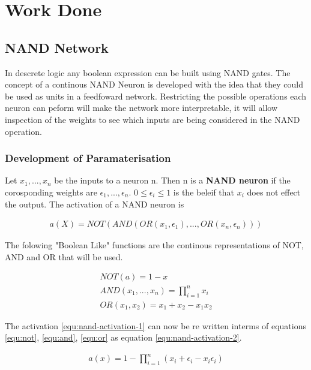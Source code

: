 \chapter{Work Done}\label{C:workdone}
\section{NAND Network}
In descrete logic any boolean expression can be built using NAND gates. The concept of a continous NAND Neuron is developed with the idea that they could be used as units in a feedfoward network. Restricting the possible operations each neuron can peform will make the network more interpretable, it will allow inspection of the weights to see which inputs are being considered in the NAND operation.

\subsection{Development of Paramaterisation}

\theoremstyle{definition}
\begin{definition}
Let $x_1, ..., x_n$ be the inputs to a neuron n.  Then n is a \textbf{NAND neuron} if the corosponding weights are $\epsilon_1, ..., \epsilon_n$. $0 \leq \epsilon_i \leq 1$ is the beleif that $x_i$ does not effect the output. The activation of a NAND neuron is 

\begin{align}
	a(X) = NOT(AND(OR(x_1, \epsilon_1), ..., OR(x_n, \epsilon_n)))
	\label{equ:nand-activation-1}
\end{align}
\end{definition}

The folowing "Boolean Like" functions are the continous representations of NOT, AND and OR that will be used.

\begin{align}
NOT(a) = 1 - x \label{equ:not} \\
AND(x_1, ..., x_n) = \prod^n_{i=1} x_i \label{equ:and} \\
OR(x_1, x_2) = x_1 + x_2 - x_1x_2 \label{equ:or}
\end{align}

The activation \ref{equ:nand-activation-1} can now be re written interms of equations \ref{equ:not}, \ref{equ:and}, \ref{equ:or} as equation \ref{equ:nand-activation-2}.

\begin{align}
	a(x) = 1 - \prod^n_{i=1} (x_i + \epsilon_i - x_i\epsilon_i)
	\label{equ:nand-activation-2}
\end{align}

